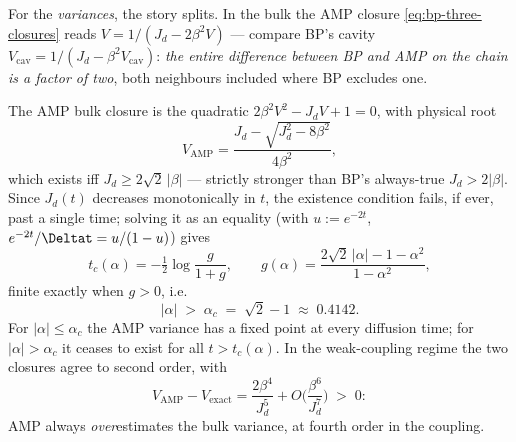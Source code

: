 For the \emph{variances}, the story splits. In the bulk the AMP closure
\eqref{eq:bp-three-closures} reads $V = 1/(J_d - 2\beta^2 V)$ --- compare
BP's cavity $V_{\mathrm{cav}} = 1/(J_d - \beta^2 V_{\mathrm{cav}})$:
\emph{the entire difference between BP and AMP on the chain is a factor of
two}, both neighbours included where BP excludes one.

\begin{theorem}
\label{thm:bp-amp-breakdown}
The AMP bulk closure is the quadratic $2\beta^2 V^2 - J_d V + 1 = 0$, with
physical root
\begin{equation}
  V_{\mathrm{AMP}}
  = \frac{J_d - \sqrt{J_d^2 - 8\beta^2}}{4\beta^2},
  \label{eq:bp-amp-var}
\end{equation}
which exists iff $J_d \geq 2\sqrt{2}\,|\beta|$ --- strictly stronger than
BP's always-true $J_d > 2|\beta|$. Since $J_d(t)$ decreases monotonically
in $t$, the existence condition fails, if ever, past a single time;
solving it as an equality (with $u := e^{-2t}$,
$e^{-2t}/\Deltat = u/(1-u)$) gives
\begin{equation}
  \boxed{\;
  t_c(\alpha) = -\tfrac{1}{2} \log \frac{g}{1+g},
  \qquad
  g(\alpha) = \frac{2\sqrt{2}\,|\alpha| - 1 - \alpha^2}{1 - \alpha^2},
  \;}
  \label{eq:bp-tc}
\end{equation}
finite exactly when $g > 0$, i.e.
\begin{equation}
  \boxed{\;|\alpha| \;>\; \alpha_c \;=\; \sqrt{2} - 1 \;\approx\; 0.4142 .\;}
  \label{eq:bp-alphac}
\end{equation}
For $|\alpha| \leq \alpha_c$ the AMP variance has a fixed point at every
diffusion time; for $|\alpha| > \alpha_c$ it ceases to exist for all
$t > t_c(\alpha)$. In the weak-coupling regime the two closures agree to
second order, with
\begin{equation}
  V_{\mathrm{AMP}} - V_{\mathrm{exact}}
  = \frac{2\beta^4}{J_d^5} + O\!\Big(\frac{\beta^6}{J_d^7}\Big)
  \;>\; 0 :
  \label{eq:bp-weak}
\end{equation}
AMP always \emph{over}estimates the bulk variance, at fourth order in the
coupling.
\end{theorem}

